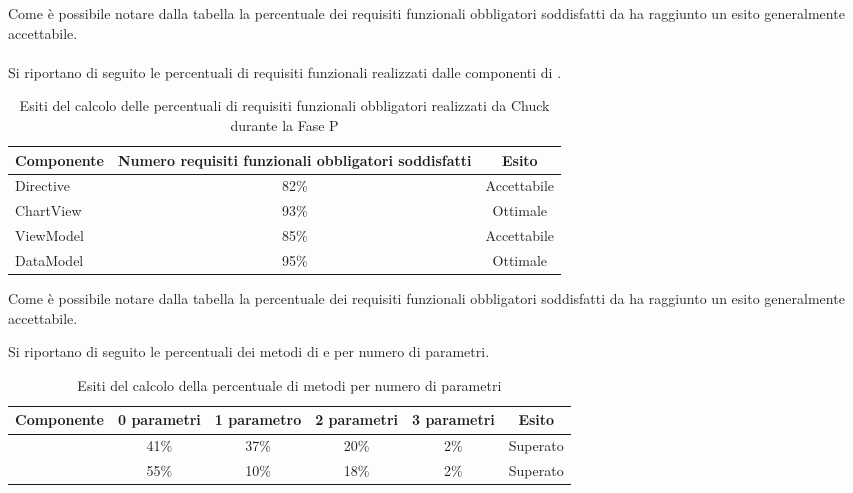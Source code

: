Come è possibile notare dalla tabella la percentuale dei requisiti funzionali obbligatori soddisfatti da  ha raggiunto un esito generalmente accettabile. 
\\ \\
Si riportano di seguito le percentuali di requisiti funzionali realizzati dalle componenti di .
\begin{table}[H]
	\centering
		\begin{tabu}{| l | c | c |}
			\hline
			Componente	& Numero requisiti funzionali obbligatori soddisfatti	& Esito		\\ \hline \hline
			Directive	& 82\% 	& Accettabile  \\ \hline
			ChartView  & 	93\%	& Ottimale  \\ \hline
			ViewModel  & 	85\%	& Accettabile  \\ \hline
			DataModel  & 	95\%	& Ottimale  \\ \hline
		\end{tabu}
	\caption{Esiti del calcolo delle percentuali di requisiti funzionali obbligatori realizzati da Chuck durante la Fase P}
\end{table}
Come è possibile notare dalla tabella la percentuale dei requisiti funzionali obbligatori soddisfatti da  ha raggiunto un esito generalmente accettabile.

Si riportano di seguito le percentuali dei metodi di  e  per numero di parametri.
\begin{table}[H]
	\centering
		\begin{tabu}{| l | c | c | c | c | c |}
			\hline
			Componente	& 0 parametri & 1 parametro & 2 parametri & 3 parametri & Esito		\\ \hline \hline
				& 41\% & 37\% & 20\% & 2\%	& Superato  \\ \hline
			  & 55\% & 10\% & 18\% & 2\%	& Superato  \\ \hline
		\end{tabu}
	\caption{Esiti del calcolo della percentuale di metodi per numero di parametri}
\end{table}



